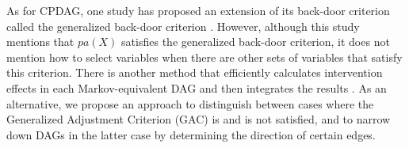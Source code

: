 As for CPDAG, one study has proposed an extension of its back-door criterion called the generalized back-door criterion \cite{maathuis2015generalized}. However, although this study mentions that $pa(X)$ satisfies the generalized back-door criterion, it does not mention how to select variables when there are other sets of variables that satisfy this criterion. There is another method that efficiently calculates intervention effects in each Markov-equivalent DAG and then integrates the results \cite{maathuis2009estimating}. As an alternative, we propose an approach to distinguish between cases where the Generalized Adjustment Criterion (GAC) \cite{perkovic2015} is and is not satisfied, and to narrow down DAGs in the latter case by determining the direction of certain edges.